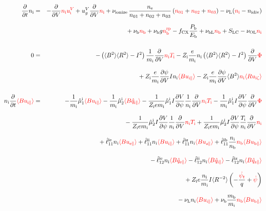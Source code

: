 \documentclass[11pt]{article}
\def\r#1{{\rm#1}}
\def\aves#1{\langle#1\rangle}
\def\dd#1#2{\frac{\partial #1}{\partial #2}}
\def\para{\parallel}
\def\ddV{\frac{\partial}{\partial V}}
\def\ddt{\frac{\partial}{\partial t}}
\def\psid{\dot{\psi}}
\def\psit{\psi_t}
\def\psitd{\dot{\psit}}
\def\mi{m_\r{i}}
\def\mb{m_\r{b}}
\def\nee{n_\r{e}}
\def\ni{n_\r{i}}
\def\nb{n_\r{b}}
\def\Ti{T_\r{i}}
\def\Zi{Z_\r{i}}
\def\uzt#1{u_{\r{#1}\zeta}}
\def\upara#1{u_{\r{#1}\para}}
\def\qhatpara#1{\hat{q}_{\r{#1}\para}}
\def\uV#1{u_\r{#1}^V}
\def\ugV{u_{g}^V}
\def\ndiv#1{n_\r{#1div}}
\def\nbrp{n_\r{b}^\r{rp}}
\def\bri{\aves{B^2}\aves{R^2} - I^2}
\def\Pb{P_\r{b}}
\def\Eb{E_\r{b}}
\def\nna{n_{01}}
\def\nnb{n_{02}}
\def\nnc{n_{03}}
\def\fCX{f_\r{CX}}
\def\nuL{\nu_\r{L}}
\def\nuion{\nu_\r{ionize}}
\def\nub{\nu_\r{b}}
\def\nuOL{\nu_\r{OL}}
\def\nubL{\nu_\r{bL}}
\def\red#1{\textcolor{red}{#1}}
\begin{document}
%
\begin{eqnarray}
  \ddt \ni &=&
%
  - \ddV \red{\ni\uV{i}}
%
  + \ugV \ddV \red{\ni}
%
  + \nuion\, \frac{\nee}{\nna + \nnb + \nnc}\, (\red{\nna} +
  \red{\nnb} + \red{\nnc})
%
  - \nuL (\red{\ni} - \ndiv{i}) 
\nonumber\\[2.5mm]&&{}
%
  + \nub \red{\nb}
%
  + \nub g \red{\nbrp}
%
  - \fCX \frac{\Pb}{\Eb}
%
  + \nubL \red{\nb}
%
  + S_\r{LC}
%
  - \nuOL \red{\ni}
%
\\[5mm]
  0 &=&
%
  -           \left( \bri \right) \frac{1}{\mi} \ddV \red{\ni \Ti}
%
  - \Zi \frac{e}{\mi} \ni \left( \bri \right) \ddV \red{\Phi}
\nonumber\\[3mm]&&{}
%
  + \Zi \frac{e}{\mi} \dd{\psi}{V} I \ni \red{\aves{B\upara{i}}}
%
  - \Zi \frac{e}{\mi} \dd{\psi}{V} \aves{B^2} \red{\ni \aves{R\uzt{i}}}
\\[5mm]
  \ni \ddt \red{\aves{B \upara{i}}} &=&
%
  - \frac{1}{\mi} \hat{\mu}_1^\r{i} \red{\aves{B \upara{i}}}
  - \frac{1}{\mi} \hat{\mu}_2^\r{i} \red{\aves{B \qhatpara{i}}}
%
  - \frac{1}{\Zi e\mi} \hat{\mu}_1^\r{i} I \dd{V}{\psi} \frac{1}{\ni}
  \ddV \red{\ni\Ti}
  - \frac{1}{\mi} \hat{\mu}_1^\r{i} I \dd{V}{\psi} \ddV \red{\Phi}
\nonumber\\[3mm]&&{}
%
  - \frac{1}{\Zi e\mi} \hat{\mu}_2^\r{i} I \dd{V}{\psi} \frac{1}{\ni}
  \ddV \red{\ni\Ti}
  + \frac{1}{\Zi e\mi} \hat{\mu}_2^\r{i} I \dd{V}{\psi} \frac{\Ti}{\ni}
  \ddV \red{\ni}
\nonumber\\[3mm]&&{}
%
  + \hat{\ell}_{11}^{\r{ie}} \ni \red{\aves{B \upara{e}}}
  + \hat{\ell}_{11}^{\r{ii}} \ni \red{\aves{B \upara{i}}}
  + \hat{\ell}_{11}^{\r{iz}} \ni \red{\aves{B \upara{z}}}
  + \hat{\ell}_{11}^{\r{ib}} \frac{\ni}{\nb} \red{\nb \aves{B \upara{b}}}
\nonumber\\[3mm]&&{}
%
  - \hat{\ell}_{12}^{\r{ie}} \ni \red{\aves{B \qhatpara{e}}}
  - \hat{\ell}_{12}^{\r{ii}} \ni \red{\aves{B \qhatpara{i}}}
  - \hat{\ell}_{12}^{\r{iz}} \ni \red{\aves{B \qhatpara{z}}}
\nonumber\\[3mm]&&{}
%
  + \Zi e \frac{\ni}{\mi} I \aves{R^{-2}} \left( - \frac{\red{\psitd}}{q} + \red{\psid} \right)
%
%
\nonumber\\[3mm]&&{}
%
  - \nuL  \ni \red{\aves{B \upara{i}}}
%
  + \nub  \frac{\mb}{\mi} \red{\nb \aves{B \upara{b}}}

\end{eqnarray}
\end{document}
